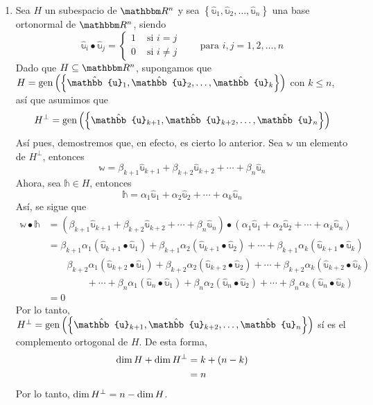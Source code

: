 \begin{theorem}
\begin{enumerate}[label=\roman*)]
        \item Sea $H$ un subespacio de $\RR[n]$ y sea $\left\{ \hat{\mathbb{u}}_1, \hat{\mathbb{u}}_2, \dots, \hat{\mathbb{u}}_n \right\}$ una base ortonormal de $\RR[n]$, siendo
        $$\hat{\mathbb{u}}_i \bullet \hat{\mathbb{u}}_j = \begin{cases}
            1 & \text{ si } i = j \\
            0 & \text{ si } i \neq j
        \end{cases} \qquad \text{para } i, j = 1, 2, \dots, n$$
        Dado que $H \subseteq \RR[n]$, supongamos que $H = \Gen \left( \left\{ \hat{\mathbb{u}}_1, \hat{\mathbb{u}}_2, \dots, \hat{\mathbb{u}}_k \right\} \right)$ con $k \leq n$, así que asumimos que
        $$H^{\bot} = \Gen \left( \left\{ \hat{\mathbb{u}}_{k+1}, \hat{\mathbb{u}}_{k+2}, \dots, \hat{\mathbb{u}}_n \right\} \right)$$
        Así pues, demostremos que, en efecto, es cierto lo anterior. Sea $\mathbb{w}$ un elemento de $H^{\bot}$, entonces
        $$\mathbb{w} = \beta_{k+1} \hat{\mathbb{u}}_{k+1} + \beta_{k+2} \hat{\mathbb{u}}_{k+2} + \cdots + \beta_n \hat{\mathbb{u}}_n$$
        Ahora, sea $\mathbb{h} \in H$, entonces
        $$\mathbb{h} = \alpha_1 \hat{\mathbb{u}}_1 + \alpha_2 \hat{\mathbb{u}}_2 + \cdots + \alpha_k \hat{\mathbb{u}}_n$$
        Así, se sigue que
        \begin{align*}
            \mathbb{w} \bullet \mathbb{h} & = \left( \beta_{k+1} \hat{\mathbb{u}}_{k+1} + \beta_{k+2} \hat{\mathbb{u}}_{k+2} + \cdots + \beta_n \hat{\mathbb{u}}_n \right) \bullet \left( \alpha_1 \hat{\mathbb{u}}_1 + \alpha_2 \hat{\mathbb{u}}_2 + \cdots + \alpha_k \hat{\mathbb{u}}_n \right) \\
            & = \beta_{k+1} \alpha_1 (\hat{\mathbb{u}}_{k+1} \bullet \hat{\mathbb{u}}_1) + \beta_{k+1} \alpha_2 (\hat{\mathbb{u}}_{k+1} \bullet \hat{\mathbb{u}}_2) + \cdots + \beta_{k+1} \alpha_k (\hat{\mathbb{u}}_{k+1} \bullet \hat{\mathbb{u}}_k) \\
            & \qquad \beta_{k+2} \alpha_1 (\hat{\mathbb{u}}_{k+2} \bullet \hat{\mathbb{u}}_1) + \beta_{k+2} \alpha_2 (\hat{\mathbb{u}}_{k+2} \bullet \hat{\mathbb{u}}_2) + \cdots + \beta_{k+2} \alpha_k (\hat{\mathbb{u}}_{k+2} \bullet \hat{\mathbb{u}}_k) \\
            & \qquad\qquad + \cdots + \beta_{n} \alpha_1 (\hat{\mathbb{u}}_{n} \bullet \hat{\mathbb{u}}_1) + \beta_{n} \alpha_2 (\hat{\mathbb{u}}_{n} \bullet \hat{\mathbb{u}}_2) + \cdots + \beta_{n} \alpha_k (\hat{\mathbb{u}}_{n} \bullet \hat{\mathbb{u}}_k) \\
            & = 0
        \end{align*}
        Por lo tanto, $H^{\bot} = \Gen \left( \left\{ \hat{\mathbb{u}}_{k+1}, \hat{\mathbb{u}}_{k+2}, \dots, \hat{\mathbb{u}}_n \right\} \right)$ sí es el complemento ortogonal de $H$. De esta forma,
        \begin{align*}
            \operatorname{dim} H + \operatorname{dim} H^{\bot} & = k + (n - k) \\
            & = n
        \end{align*}
        Por lo tanto, $\operatorname{dim} H^{\bot} = n - \operatorname{dim} H$.
    \end{enumerate}
\end{theorem}

